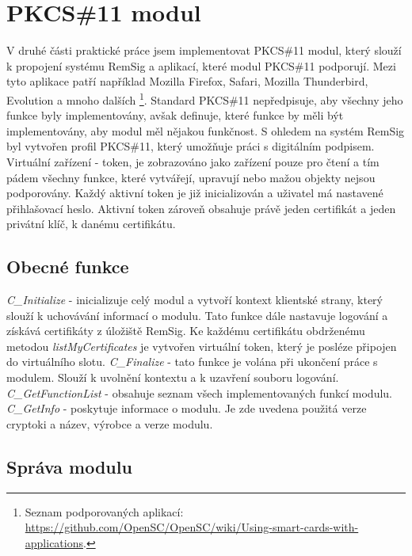 \documentclass[]{fithesis3}
\begin{document}
	\section{PKCS\#11 modul}
	
	V druhé části praktické práce jsem implementovat PKCS\#11 modul, který slouží k propojení 		systému RemSig a aplikací, které modul PKCS\#11 podporují. Mezi tyto aplikace patří například 	Mozilla Firefox, Safari, Mozilla Thunderbird, Evolution a mnoho dalších
\footnote{Seznam podporovaných aplikací: \url{https://github.com/OpenSC/OpenSC/wiki/Using-smart-cards-with-applications}.}. 
	Standard PKCS\#11 nepředpisuje, aby všechny jeho funkce byly implementovány, avšak 			definuje, které funkce by měli být implementovány, aby modul měl nějakou funkčnost. S ohledem 	na systém RemSig byl vytvořen profil PKCS\#11, který umožňuje práci s digitálním podpisem. 		Virtuální zařízení - token, je zobrazováno jako zařízení pouze pro čtení a tím pádem všechny 		funkce, které vytvářejí, upravují nebo mažou objekty nejsou podporovány. Každý aktivní token je 	již inicializován a uživatel má nastavené přihlašovací heslo. Aktivní token zároveň obsahuje 			právě jeden certifikát a jeden privátní klíč, k danému certifikátu.

	\subsection{Obecné funkce} 
	\textit{C\_Initialize} - inicializuje celý modul a vytvoří kontext klientské strany, který slouží k 		uchovávání informací o modulu. Tato funkce dále nastavuje logování a získává certifikáty z 			úložiště RemSig. Ke každému certifikátu obdrženému metodou \textit{listMyCertificates} je 			vytvořen virtuální token, který je posléze připojen do virtuálního slotu. 
	\newline
 	\newline
	\textit{C\_Finalize} - tato funkce je volána při ukončení práce s modulem. Slouží k uvolnění 			kontextu a k uzavření souboru logování.
	\newline
	\newline
	\textit{C\_GetFunctionList} - obsahuje seznam všech implementovaných funkcí modulu.
	\newline
	\newline
	\textit{C\_GetInfo} - poskytuje informace o modulu. Je zde uvedena použitá verze 				cryptoki a název, výrobce a verze modulu.

	\subsection{Správa modulu} 
\end{document}

